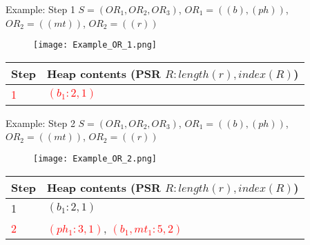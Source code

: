 \begin{frame}[noframenumbering]{Example: Step 1}
	$S = (OR_1, OR_2, OR_3)$, $OR_1 = ((b), (ph))$, $OR_2 = ((mt))$, $OR_2 = ((r))$
	
	\begin{figure}[h]
		\texttt{[image: Example\_OR\_1.png]}
	\end{figure}
	
	\begin{table}[h]
		\centering
		\begin{tabular}{ |l|p{10cm}| } 
			\hline
			Step & Heap contents (PSR $R : length(r), index(R)$) \\
			\hline
			\textcolor{red}{1} & \textcolor{red}{$(b_1 : 2, 1)$} \\ 
			\hline
		\end{tabular}
	\end{table}

\end{frame}

\begin{frame}[noframenumbering]{Example: Step 2}
	$S = (OR_1, OR_2, OR_3)$, $OR_1 = ((b), (ph))$, $OR_2 = ((mt))$, $OR_2 = ((r))$
	
	\begin{figure}[h]
		\texttt{[image: Example\_OR\_2.png]}
	\end{figure}
	
	\begin{table}[h]
		\centering
		\begin{tabular}{ |l|p{10cm}| } 
			\hline
			Step & Heap contents (PSR $R : length(r), index(R)$) \\
			\hline
			1 & $(b_1 : 2, 1)$ \\ 
			\hline
			\textcolor{red}{2} & \textcolor{red}{$(ph_1 : 3, 1)$}, \textcolor{red}{$(b_1, mt_1 : 5, 2)$} \\ 
			\hline
		\end{tabular}
	\end{table}

\end{frame}

